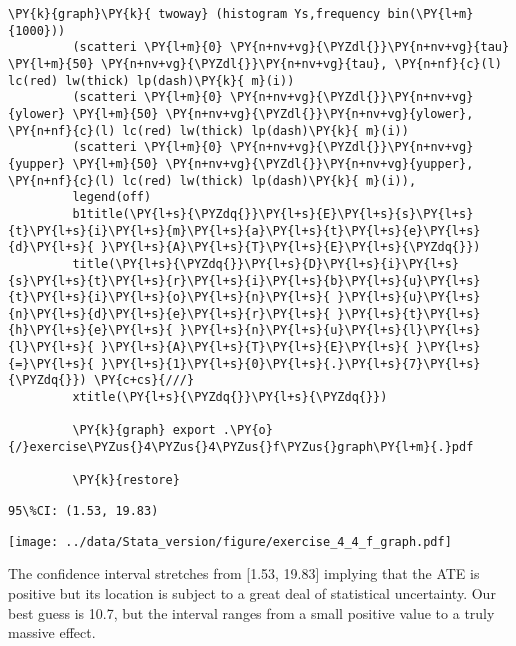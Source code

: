\documentclass[11pt,notitlepage]{article}\usepackage[]{graphicx}\usepackage[]{color}
\makeatletter
\newenvironment{kframe}{%
 \def\at@end@of@kframe{}%
 \ifinner\ifhmode%
  \def\at@end@of@kframe{\end{minipage}}%
  \begin{minipage}{\columnwidth}%
 \fi\fi%
 \def\FrameCommand##1{\hskip\@totalleftmargin \hskip-\fboxsep
 \colorbox{shadecolor}{##1}\hskip-\fboxsep
     \hskip-\linewidth \hskip-\@totalleftmargin \hskip\columnwidth}%
 \MakeFramed {\advance\hsize-\width
   \@totalleftmargin\z@ \linewidth\hsize
   \@setminipage}}%
 {\par\unskip\endMakeFramed%
 \at@end@of@kframe}
\newenvironment{knitrout}{}{} %
\makeatother
\begin{document}
\begin{enumerate}[a)]
\begin{knitrout}
\begin{kframe}
\begin{Verbatim}[commandchars=\\\{\}]
         \PY{k}{graph}\PY{k}{ twoway} (histogram Ys,frequency bin(\PY{l+m}{1000})) 
         (scatteri \PY{l+m}{0} \PY{n+nv+vg}{\PYZdl{}}\PY{n+nv+vg}{tau} \PY{l+m}{50} \PY{n+nv+vg}{\PYZdl{}}\PY{n+nv+vg}{tau}, \PY{n+nf}{c}(l) lc(red) lw(thick) lp(dash)\PY{k}{ m}(i)) 
         (scatteri \PY{l+m}{0} \PY{n+nv+vg}{\PYZdl{}}\PY{n+nv+vg}{ylower} \PY{l+m}{50} \PY{n+nv+vg}{\PYZdl{}}\PY{n+nv+vg}{ylower}, \PY{n+nf}{c}(l) lc(red) lw(thick) lp(dash)\PY{k}{ m}(i)) 
         (scatteri \PY{l+m}{0} \PY{n+nv+vg}{\PYZdl{}}\PY{n+nv+vg}{yupper} \PY{l+m}{50} \PY{n+nv+vg}{\PYZdl{}}\PY{n+nv+vg}{yupper}, \PY{n+nf}{c}(l) lc(red) lw(thick) lp(dash)\PY{k}{ m}(i)),
         legend(off) 
         b1title(\PY{l+s}{\PYZdq{}}\PY{l+s}{E}\PY{l+s}{s}\PY{l+s}{t}\PY{l+s}{i}\PY{l+s}{m}\PY{l+s}{a}\PY{l+s}{t}\PY{l+s}{e}\PY{l+s}{d}\PY{l+s}{ }\PY{l+s}{A}\PY{l+s}{T}\PY{l+s}{E}\PY{l+s}{\PYZdq{}}) 
         title(\PY{l+s}{\PYZdq{}}\PY{l+s}{D}\PY{l+s}{i}\PY{l+s}{s}\PY{l+s}{t}\PY{l+s}{r}\PY{l+s}{i}\PY{l+s}{b}\PY{l+s}{u}\PY{l+s}{t}\PY{l+s}{i}\PY{l+s}{o}\PY{l+s}{n}\PY{l+s}{ }\PY{l+s}{u}\PY{l+s}{n}\PY{l+s}{d}\PY{l+s}{e}\PY{l+s}{r}\PY{l+s}{ }\PY{l+s}{t}\PY{l+s}{h}\PY{l+s}{e}\PY{l+s}{ }\PY{l+s}{n}\PY{l+s}{u}\PY{l+s}{l}\PY{l+s}{l}\PY{l+s}{ }\PY{l+s}{A}\PY{l+s}{T}\PY{l+s}{E}\PY{l+s}{ }\PY{l+s}{=}\PY{l+s}{ }\PY{l+s}{1}\PY{l+s}{0}\PY{l+s}{.}\PY{l+s}{7}\PY{l+s}{\PYZdq{}}) \PY{c+cs}{///}
         xtitle(\PY{l+s}{\PYZdq{}}\PY{l+s}{\PYZdq{}})
         
         \PY{k}{graph} export .\PY{o}{/}exercise\PYZus{}4\PYZus{}4\PYZus{}f\PYZus{}graph\PY{l+m}{.}pdf
         
         \PY{k}{restore}
\end{Verbatim}

    \begin{Verbatim}[commandchars=\\\{\}]
95\%CI: (1.53, 19.83)
    \end{Verbatim}
\end{kframe}

{\centering \texttt{[image: ../data/Stata\_version/figure/exercise\_4\_4\_f\_graph.pdf]} 

}


\end{knitrout}

The confidence interval stretches from [1.53, 19.83] implying that the ATE is positive but its location is subject to a great deal of statistical uncertainty.  Our best guess is 10.7, but the interval ranges from a small positive value to a truly massive effect.


\end{enumerate}
\end{document}
